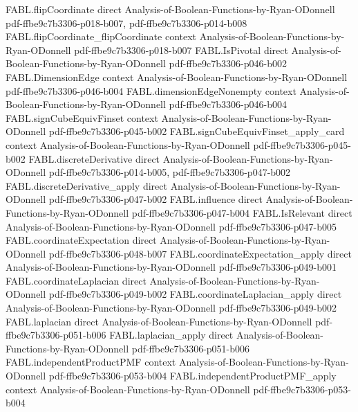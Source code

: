 \begin{theorem}
\proofstep
  {FABL.flipCoordinate}
  {direct}
  {Analysis-of-Boolean-Functions-by-Ryan-ODonnell}
  {pdf-ffbe9c7b3306-p018-b007,
    pdf-ffbe9c7b3306-p014-b008}
\proofstep
  {FABL.flipCoordinate_flipCoordinate}
  {context}
  {Analysis-of-Boolean-Functions-by-Ryan-ODonnell}
  {pdf-ffbe9c7b3306-p018-b007}
\proofstep
  {FABL.IsPivotal}
  {direct}
  {Analysis-of-Boolean-Functions-by-Ryan-ODonnell}
  {pdf-ffbe9c7b3306-p046-b002}
\proofstep
  {FABL.DimensionEdge}
  {context}
  {Analysis-of-Boolean-Functions-by-Ryan-ODonnell}
  {pdf-ffbe9c7b3306-p046-b004}
\proofstep
  {FABL.dimensionEdgeNonempty}
  {context}
  {Analysis-of-Boolean-Functions-by-Ryan-ODonnell}
  {pdf-ffbe9c7b3306-p046-b004}
\proofstep
  {FABL.signCubeEquivFinset}
  {context}
  {Analysis-of-Boolean-Functions-by-Ryan-ODonnell}
  {pdf-ffbe9c7b3306-p045-b002}
\proofstep
  {FABL.signCubeEquivFinset_apply_card}
  {context}
  {Analysis-of-Boolean-Functions-by-Ryan-ODonnell}
  {pdf-ffbe9c7b3306-p045-b002}
\proofstep
  {FABL.discreteDerivative}
  {direct}
  {Analysis-of-Boolean-Functions-by-Ryan-ODonnell}
  {pdf-ffbe9c7b3306-p014-b005,
    pdf-ffbe9c7b3306-p047-b002}
\proofstep
  {FABL.discreteDerivative_apply}
  {direct}
  {Analysis-of-Boolean-Functions-by-Ryan-ODonnell}
  {pdf-ffbe9c7b3306-p047-b002}
\proofstep
  {FABL.influence}
  {direct}
  {Analysis-of-Boolean-Functions-by-Ryan-ODonnell}
  {pdf-ffbe9c7b3306-p047-b004}
\proofstep
  {FABL.IsRelevant}
  {direct}
  {Analysis-of-Boolean-Functions-by-Ryan-ODonnell}
  {pdf-ffbe9c7b3306-p047-b005}
\proofstep
  {FABL.coordinateExpectation}
  {direct}
  {Analysis-of-Boolean-Functions-by-Ryan-ODonnell}
  {pdf-ffbe9c7b3306-p048-b007}
\proofstep
  {FABL.coordinateExpectation_apply}
  {direct}
  {Analysis-of-Boolean-Functions-by-Ryan-ODonnell}
  {pdf-ffbe9c7b3306-p049-b001}
\proofstep
  {FABL.coordinateLaplacian}
  {direct}
  {Analysis-of-Boolean-Functions-by-Ryan-ODonnell}
  {pdf-ffbe9c7b3306-p049-b002}
\proofstep
  {FABL.coordinateLaplacian_apply}
  {direct}
  {Analysis-of-Boolean-Functions-by-Ryan-ODonnell}
  {pdf-ffbe9c7b3306-p049-b002}
\proofstep
  {FABL.laplacian}
  {direct}
  {Analysis-of-Boolean-Functions-by-Ryan-ODonnell}
  {pdf-ffbe9c7b3306-p051-b006}
\proofstep
  {FABL.laplacian_apply}
  {direct}
  {Analysis-of-Boolean-Functions-by-Ryan-ODonnell}
  {pdf-ffbe9c7b3306-p051-b006}
\proofstep
  {FABL.independentProductPMF}
  {context}
  {Analysis-of-Boolean-Functions-by-Ryan-ODonnell}
  {pdf-ffbe9c7b3306-p053-b004}
\proofstep
  {FABL.independentProductPMF_apply}
  {context}
  {Analysis-of-Boolean-Functions-by-Ryan-ODonnell}
  {pdf-ffbe9c7b3306-p053-b004}
\proofstep

\end{theorem}
